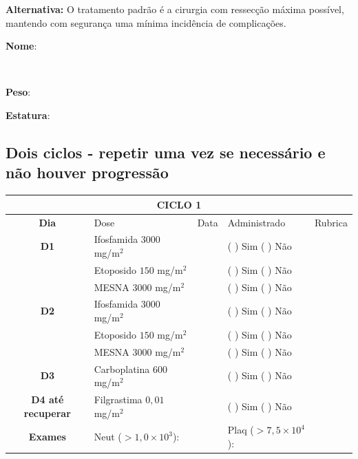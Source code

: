 \documentclass[11pt,a4paper,oldfontcommands]{memoir}
\def\entrywithlabel[#1]#2{\parbox{#1}{{\small #2:} \hrulefill}}
\begin{document}
\textbf{Alternativa:} O tratamento padrão é a cirurgia com ressecção máxima possível, mantendo com segurança uma mínima incidência de complicações. 
\\[0.4cm]
\entrywithlabel[1\hsize]{\textbf{Nome}}\hfill
\\[0.3cm]
\entrywithlabel[.45\hsize]{\textbf{Peso}}\hfill  \entrywithlabel[.45\hsize]{\textbf{Estatura}}

\subsection{Dois ciclos - repetir uma vez se necessário e não houver progressão}

\begin{center}
\begin{table}[H]
\begin{tabular}{c|p{5cm}|p{1.4cm}|p{2.8cm}|p{2.5cm}}
	\hline
	\multicolumn{5}{c}{\textbf{CICLO 1}}\\
\hline
    \multicolumn{1}{c|}{\multirow{1}{*}{\textbf{Dia}}}&{Dose}&{Data}&{Administrado}&{Rubrica} \\
    \hline
    \multicolumn{1}{c|}{\multirow{1}{*}{\textbf{D1}}}&{Ifosfamida \(3000\) mg/m\(^2\)}&&{(  ) Sim (  ) Não}&\\
    \multicolumn{1}{c|}{\multirow{1}{*}{\textbf{}}}&{Etoposido \(150\) mg/m\(^2\)}&&{(  ) Sim (  ) Não}&\\
    \multicolumn{1}{c|}{\multirow{1}{*}{\textbf{}}}&{MESNA \(3000\) mg/m\(^2\)}&&{(  ) Sim (  ) Não}&\\
    \multicolumn{1}{c|}{\multirow{1}{*}{\textbf{D2}}}&{Ifosfamida \(3000\) mg/m\(^2\)}&&{(  ) Sim (  ) Não}&\\
    \multicolumn{1}{c|}{\multirow{1}{*}{\textbf{}}}&{Etoposido \(150\) mg/m\(^2\)}&&{(  ) Sim (  ) Não}&\\
    \multicolumn{1}{c|}{\multirow{1}{*}{\textbf{}}}&{MESNA \(3000\) mg/m\(^2\)}&&{(  ) Sim (  ) Não}&\\
     \multicolumn{1}{c|}{\multirow{1}{*}{\textbf{D3}}}&{Carboplatina \(600\) mg/m\(^2\)}&&{(  ) Sim (  ) Não}&\\
    \hline
    \multicolumn{1}{c|}{\multirow{1}{*}{\textbf{D4 até recuperar}}}&{Filgrastima \(0,01\) mg/m\(^2\)}&&{(  ) Sim (  ) Não}&\\
    \hline
    \multicolumn{1}{c|}{\multirow{1}{*}{\textbf{Exames}}}&\multicolumn{2}{l|}{Neut (\(>1,0\times10^3\)):}&{Plaq (\(>7,5\times10^4\)):}&{}\\
    \hline
\end{tabular}
\end{table}


\end{center}
\end{document}
